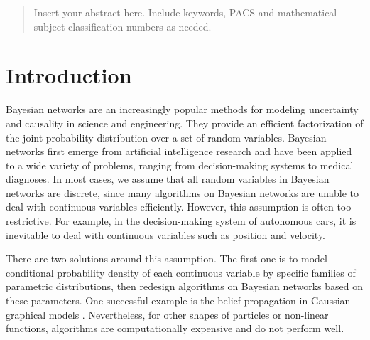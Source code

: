 

\date{Received: date / Accepted: date}


\maketitle

\begin{abstract}
Insert your abstract here. Include keywords, PACS and mathematical
subject classification numbers as needed.
\end{abstract}

\section{Introduction}
\label{intro}
Bayesian networks \citep{Pearl_1988, PGM_2009}  are an increasingly popular methods for modeling uncertainty and causality in science and engineering. They provide an efficient factorization of the joint probability distribution over a set of random variables. Bayesian networks first emerge from artificial intelligence research and have been applied to a wide variety of problems, ranging from decision-making systems \citep{DMU_2015} to medical diagnoses. In most cases, we assume that all random variables in Bayesian networks are discrete, since many algorithms on Bayesian networks are unable to deal with continuous variables efficiently. However, this assumption is often too restrictive. For example, in the decision-making system of autonomous cars, it is inevitable to deal with continuous variables such as position and velocity. 

There are two solutions around this assumption. The first one is to model conditional probability density of each continuous variable by specific families of parametric distributions, then redesign algorithms on Bayesian networks based on these parameters. One successful example is the belief propagation in Gaussian graphical models \citep{Weiss_2011}. Nevertheless, for other shapes of particles \citep{Ihler_2009} or non-linear functions, algorithms are computationally expensive and do not perform well.

